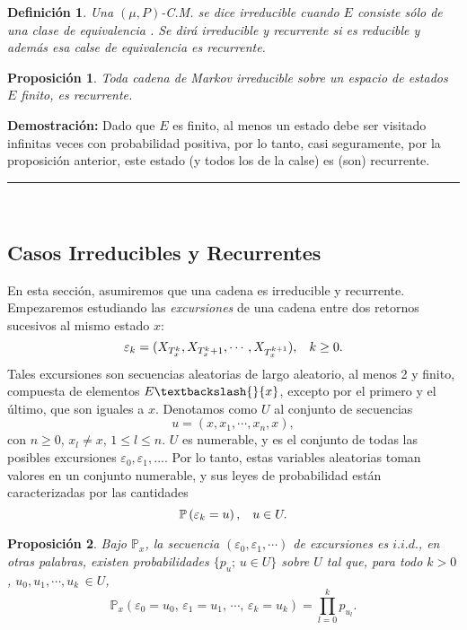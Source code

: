 \documentclass[a4paper]{article}
\newcommand{\prob}{\mathbb{P}}
\newtheorem{definicion}{Definición}
\newtheorem{prop}{Proposici\'on}
\numberwithin{equation}{subsection}
\numberwithin{definicion}{subsection}
\begin{document}
\begin{definicion}
Una $(\mu,P)$-C.M. se dice irreducible cuando $E$ consiste sólo de una clase de equivalencia . Se dirá irreducible y recurrente si es reducible y además esa calse de equivalencia es  recurrente.
\end{definicion}

\begin{prop}
Toda cadena de Markov irreducible sobre un espacio de estados $E$ finito, es recurrente.
\end{prop}

\textbf{Demostración: }Dado que $E$ es finito, al menos un estado debe ser visitado infinitas veces con probabilidad positiva, por lo tanto,  casi seguramente, por la proposición anterior, este estado (y todos los de la calse) es (son) recurrente.\\
\rule{0.7em}{0.7em}\\ \newline

\subsection{Casos Irreducibles y Recurrentes}
En esta sección, asumiremos que una cadena es irreducible y recurrente. Empezaremos estudiando las \textit{excursiones} de una cadena entre dos retornos sucesivos al mismo estado $x$:
\[\varepsilon_k = (X_{T_x^k},X_{T_x^k+1},\cdots,X_{T_x^{k+1}}),\hspace{0.3cm}k\geq 0.\]
Tales excursiones son secuencias aleatorias de largo aleatorio, al menos 2 y finito, compuesta de elementos $E\textbackslash{}\{x\}$, excepto por el primero y el último, que son iguales a $x$. Denotamos como $U$ al conjunto de secuencias
\[u = (x,x_1,\cdots,x_n,x),\]
con $n\geq 0$, $x_l\neq x$, $1\leq l \leq n$. $U$ es numerable, y es el conjunto de todas las posibles excursiones $\varepsilon_0,\varepsilon_1,...$. Por lo tanto, estas variables aleatorias toman valores en un conjunto numerable, y sus leyes de probabilidad están caracterizadas por las cantidades
\[\prob\left(\varepsilon_k = u\right),\hspace{0.3cm}u\in U.\]

\begin{prop}
Bajo $\prob_x$, la secuencia $(\varepsilon_0,\varepsilon_1,\cdots)$ de excursiones es $i.i.d.$, en otras palabras, existen probabilidades $\{p_u;\,u\in U\}$ sobre $U$ tal que, para todo $k>0$, $u_0,u_1,\cdots,u_k\,\in U$,
\[\prob_x\left(\varepsilon_0 = u_0,\,\varepsilon_1 = u_1,\,\cdots,\,\varepsilon_k = u_k\right) = \prod_{l=0}^k p_{u_l}.\]
\end{prop}
\end{document}
